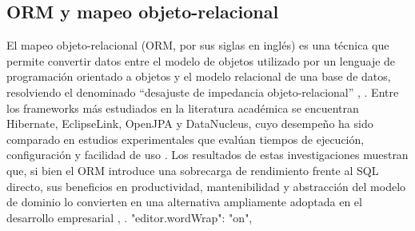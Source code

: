 \subsection{ORM y mapeo objeto-relacional}

El mapeo objeto-relacional (ORM, por sus siglas en inglés) es una técnica que permite convertir datos entre el modelo de objetos utilizado por un lenguaje de programación orientado a objetos y el modelo relacional de una base de datos, resolviendo el denominado ``desajuste de impedancia objeto-relacional'' \cite{ubt_jpa}, \cite{vanzyl_orm}. Entre los frameworks más estudiados en la literatura académica se encuentran Hibernate, EclipseLink, OpenJPA y DataNucleus, cuyo desempeño ha sido comparado en estudios experimentales que evalúan tiempos de ejecución, configuración y facilidad de uso \cite{jcsi_orm}. Los resultados de estas investigaciones muestran que, si bien el ORM introduce una sobrecarga de rendimiento frente al SQL directo, sus beneficios en productividad, mantenibilidad y abstracción del modelo de dominio lo convierten en una alternativa ampliamente adoptada en el desarrollo empresarial \cite{vanzyl_orm}, \cite{lazarenko_arch}.
    "editor.wordWrap": "on",